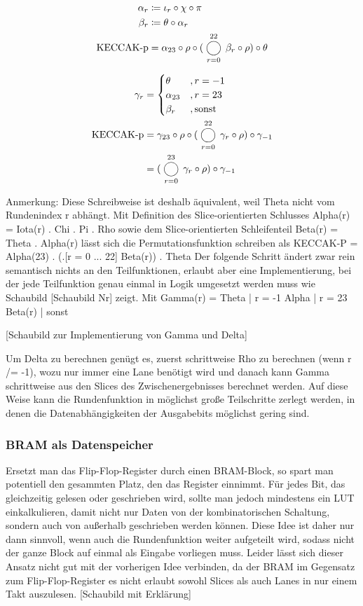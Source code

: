 \begin{align*}
    \alpha_r & \coloneq \iota_r \circ \chi \circ \pi \\
    \beta_r & \coloneq \theta \circ \alpha_r \\
    \text{KECCAK-p} & = \alpha_{23} \circ \rho \circ (\bigcomp_{r = 0}^{22} \beta_r \circ \rho) \circ \theta
\end{align*}

\begin{align*}
    \gamma_r & = 
    \begin{cases}
        \theta & , r = -1 \\
        \alpha_{23} & , r = 23 \\
        \beta_r & , \text{sonst}
    \end{cases} \\
    \text{KECCAK-p} & = \gamma_{23} \circ \rho \circ (\bigcomp_{r = 0}^{22} \gamma_r \circ \rho) \circ \gamma_{-1} \\
    & = (\bigcomp_{r = 0}^{23} \gamma_r \circ \rho) \circ \gamma_{-1}
\end{align*}

Anmerkung: Diese Schreibweise ist deshalb äquivalent, weil Theta nicht vom Rundenindex r abhängt.
Mit Definition des Slice-orientierten Schlusses Alpha(r) = Iota(r) . Chi . Pi . Rho sowie dem Slice-orientierten Schleifenteil
Beta(r) = Theta . Alpha(r)
lässt sich die Permutationsfunktion schreiben als
KECCAK-P = Alpha(23) . (.[r = 0 ... 22] Beta(r)) . Theta
Der folgende Schritt ändert zwar rein semantisch nichts an den Teilfunktionen, erlaubt aber eine Implementierung, bei der jede Teilfunktion
genau einmal in Logik umgesetzt werden muss wie Schaubild [Schaubild Nr] zeigt.
Mit Gamma(r) =  Theta   | r = -1
				Alpha	| r = 23
				Beta(r) | sonst

[Schaubild zur Implementierung von Gamma und Delta]

Um Delta zu berechnen genügt es, zuerst schrittweise Rho zu berechnen (wenn r /= -1), wozu nur immer eine Lane benötigt wird
und danach kann Gamma schrittweise aus den Slices des Zwischenergebnisses berechnet werden.
Auf diese Weise kann die Rundenfunktion in möglichst große Teilschritte zerlegt werden, in denen die Datenabhängigkeiten der Ausgabebits möglichst gering sind.

\subsubsection{BRAM als Datenspeicher}
Ersetzt man das Flip-Flop-Register durch einen BRAM-Block, so spart man potentiell den gesammten Platz, den das Register einnimmt.
Für jedes Bit, das gleichzeitig gelesen oder geschrieben wird, sollte man jedoch mindestens ein LUT einkalkulieren,
damit nicht nur Daten von der kombinatorischen Schaltung, sondern auch von außerhalb geschrieben werden können.
Diese Idee ist daher nur dann sinnvoll, wenn auch die Rundenfunktion weiter aufgeteilt wird, sodass nicht der ganze Block auf einmal als Eingabe vorliegen muss.
Leider lässt sich dieser Ansatz nicht gut mit der vorherigen Idee verbinden, da der BRAM im Gegensatz zum Flip-Flop-Register es nicht erlaubt sowohl Slices als auch Lanes in nur einem Takt auszulesen.
[Schaubild mit Erklärung]

